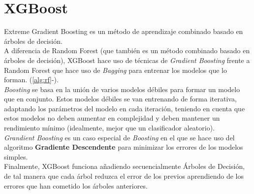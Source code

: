 \section{XGBoost}
\label{alg:xgb}
Extreme Gradient Boosting es un método de aprendizaje combinado basado en árboles de decisión.\\
A diferencia de Random Forest (que también es un método combinado basado en árboles de decisión), XGBoost hace uso de técnicas de \textit{Gradient Boosting} frente a Random Forest que hace uso de \textit{Bagging} para entrenar los modelos que lo forman. (\ref{alg:rf}-).\\
\linebreak
\textit{Boosting} se basa en la unión de varios modelos débiles para formar un modelo que en conjunto. Estos modelos débiles se van entrenando de forma iterativa, adaptando los parámetros del modelo en cada iteración, teniendo en cuenta que estos modelos no deben aumentar en complejidad y deben mantener un rendimiento mínimo (idealmente, mejor que un clasificador aleatorio).\\
\linebreak
\textit{Grandient Boosting} es un caso especial de \textit{Boosting} en el que se hace uso del algoritmo \textbf{Gradiente Descendente} para minimizar los errores de los modelos simples.\\
\linebreak
Finalmente, XGBoost funciona añadiendo secuencialmente Árboles de Decisión, de tal manera que cada árbol reduzca el error de los previos aprendiendo de los errores que han cometido los árboles anteriores.
\clearpage
